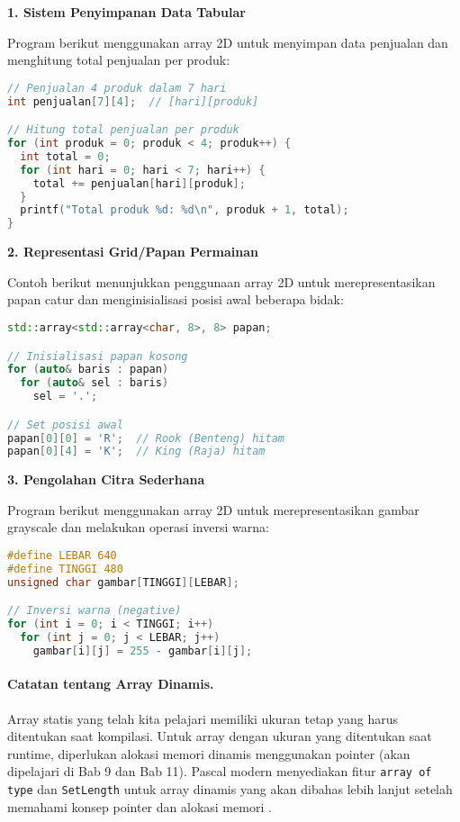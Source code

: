 \documentclass[../main.tex]{subfiles}
\begin{document}
\textbf{1. Sistem Penyimpanan Data Tabular}

Program berikut menggunakan array 2D untuk menyimpan data penjualan dan menghitung total penjualan per produk:

\begin{lstlisting}[language=C, caption={Tabel data penjualan}]
// Penjualan 4 produk dalam 7 hari
int penjualan[7][4];  // [hari][produk]

// Hitung total penjualan per produk
for (int produk = 0; produk < 4; produk++) {
  int total = 0;
  for (int hari = 0; hari < 7; hari++) {
    total += penjualan[hari][produk];
  }
  printf("Total produk %d: %d\n", produk + 1, total);
}
\end{lstlisting}

\textbf{2. Representasi Grid/Papan Permainan}

Contoh berikut menunjukkan penggunaan array 2D untuk merepresentasikan papan catur dan menginisialisasi posisi awal beberapa bidak:

\begin{lstlisting}[language=C++, caption={Papan catur 8x8}]
std::array<std::array<char, 8>, 8> papan;

// Inisialisasi papan kosong
for (auto& baris : papan)
  for (auto& sel : baris)
    sel = '.';

// Set posisi awal
papan[0][0] = 'R';  // Rook (Benteng) hitam
papan[0][4] = 'K';  // King (Raja) hitam
\end{lstlisting}

\textbf{3. Pengolahan Citra Sederhana}

Program berikut menggunakan array 2D untuk merepresentasikan gambar grayscale dan melakukan operasi inversi warna:

\begin{lstlisting}[language=C, caption={Matriks pixel grayscale}]
#define LEBAR 640
#define TINGGI 480
unsigned char gambar[TINGGI][LEBAR];

// Inversi warna (negative)
for (int i = 0; i < TINGGI; i++)
  for (int j = 0; j < LEBAR; j++)
    gambar[i][j] = 255 - gambar[i][j];
\end{lstlisting}

\paragraph{Catatan tentang Array Dinamis.} Array statis yang telah kita pelajari memiliki ukuran tetap yang harus ditentukan saat kompilasi. Untuk array dengan ukuran yang ditentukan saat runtime, diperlukan alokasi memori dinamis menggunakan pointer (akan dipelajari di Bab 9 dan Bab 11). Pascal modern menyediakan fitur \texttt{array of type} dan \texttt{SetLength} untuk array dinamis yang akan dibahas lebih lanjut setelah memahami konsep pointer dan alokasi memori \parencite{pascal-dynarray}.
\end{document}
